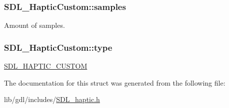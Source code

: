 \subsubsection[{samples}]{ S\+D\+L\+\_\+\+Haptic\+Custom\+::samples}\label{struct_s_d_l___haptic_custom_a5905ea1b6182da846535ca8c80b4fa33}
Amount of samples. \hypertarget{struct_s_d_l___haptic_custom_a98a8995c94492069dc007502ed97eed2}{}
\subsubsection[{type}]{ S\+D\+L\+\_\+\+Haptic\+Custom\+::type}\label{struct_s_d_l___haptic_custom_a98a8995c94492069dc007502ed97eed2}
\hyperlink{_s_d_l__haptic_8h_a8a18c4de1076ac9bebd718329d16db29}{S\+D\+L\+\_\+\+H\+A\+P\+T\+I\+C\+\_\+\+C\+U\+S\+T\+O\+M} 

The documentation for this struct was generated from the following file\+:\begin{DoxyCompactItemize}
\item 
lib/gdl/includes/\hyperlink{_s_d_l__haptic_8h}{S\+D\+L\+\_\+haptic.\+h}\end{DoxyCompactItemize}
